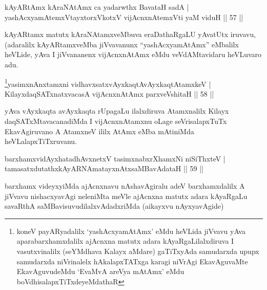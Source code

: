 \begin{shl}
kAyARtAmx kAraNAtAmx ca yadarwthx BavataH sadA |\\
yashAcxyamAtemxVtayxtorxVkotxV vijAcnxnAtemxVti yaM viduH \hfill || 57 ||
\end{shl}

\begin{artha}
kAyARtamx matutx kAraNAtamxveMbuva eraDathaRgaLU yAvatUtx iruvavu, (adaralilx kAyARtamxveMba jiVvavanunx ``yashAcxyamAtAmx'' eMbalilx heVLide, yAva I jiVvananenx vijAcnxnAtAmx eMdu veVdAMtavidaru heVLuvaro adu.
\end{artha}


\begin{shl}
\footnote{koneV payARyadalilx `yashAcxyamAtAmx' eMdu heVLida jiVvavu yAva aparabarxhamxdalilx ajAcnxna matutx adara kAyaRgaLilalxdiruva I vasutxvinalilx (seYMdhava Kalayx aMdare) gaTiTxyAda samudarxda upupx samudarxda niVrinalelx hAkalapxTATxga karagi niVrAgi EkavAguvaMte EkavAguvudeMdu `EvaMvA areV\s ya mAtAmx' eMdu   boVdhisalapxTiTxdeyeMdathaR}yasimxnAnxtamxni vidhavxsatxvAyxkaqtAvAyxkaqtAtamxkeV |\\
KilayxdaqSATxnatxvacasA vijAcnxnAtAmx parxveVshitaH \hfill || 58 ||
\end{shl}

\begin{artha}
 yAva vAyxkaqta avAyxkaqta rUpagaLu ilalxdiruva Atamxnalilx Kilayx daqSATxMtavacanadiMda I vijAcnxnAtamxnu oLage seVrisalapxTuTx EkavAgiruvano A AtamxneV ililx AtAmx eMba mAtiniMda heVLalapxTiTxruvanu.
\end{artha}


\begin{shl}
barxhamxvidAyxhatadhAvxnetxV tasimxnabxrXhamxNi niSiThxteV |\\
tamasatxdutathxkAyARNAmatayxnAtxsaMBavAdataH \hfill || 59 ||
\end{shl}

\begin{artha}
barxhamx videyxyiMda ajAcnxnavu nAshavAgiralu adeV barxhamxdalilx A
jiVvavu nishacxyavAgi neleniMta meVle ajAcnxna matutx adara kAyaRgaLu
savaRthA saMBavisuvudilalxvAdadxriMda (aikayxvu nAyxyavAgide)
\end{artha}


